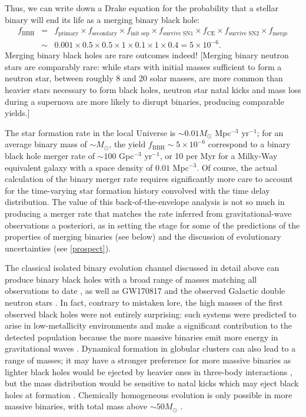 \documentclass[iop,onecolumn]{revtex4}
\begin{document}
Thus, we can write down a Drake equation for the probability that a stellar binary will end its life as a merging binary black hole:
\begin{eqnarray}
f_\textrm{BBH} &=& f_\textrm{primary} \times f_\textrm{secondary} \times f_\textrm{init sep} \times f_\textrm{survive SN1} \times f_\textrm{CE} \times f_\textrm{survive SN2} \times f_\textrm{merge} \nonumber \\
 & \sim & 0.001 \times 0.5 \times 0.5 \times 1 \times 0.1 \times 1 \times 0.4 = 5 \times 10^{-6}.
\end{eqnarray}
Merging binary black holes are rare outcomes indeed!  [Merging binary neutron stars are comparably rare: while stars with initial masses sufficient to form a neutron star, between roughly 8 and 20 solar masses, are more common than heavier stars necessary to form black holes, neutron star natal kicks and mass loss during a supernova are more likely to disrupt binaries, producing comparable yields.]

The star formation rate in the local Universe is $\sim 0.01 M_\odot$ Mpc$^{-3}$ yr$^{-1}$; for an average binary mass of $\sim M_\odot$, the yield $f_\textrm{BBH} \sim 5 \times 10^{-6}$ correspond to a binary black hole merger rate of $\sim 100$ Gpc$^{-3}$ yr$^{-1}$, or 10 per Myr for a Milky-Way equivalent galaxy with a space density of $0.01$ Mpc$^{-3}$.  Of course, the actual calculation of the binary merger rate requires significantly more care to account for the time-varying star formation history convolved with the time delay distribution.  The value of this back-of-the-envelope analysis is not so much in producing a merger rate that matches the rate inferred from gravitational-wave observations a posteriori, as in setting the stage for some of the predictions of the properties of merging binaries (see below) and the discussion of evolutionary uncertainties (see \autoref{prospect}).

The classical isolated binary evolution channel discussed in detail above can produce binary black holes with a broad range of masses matching all observations to date \citep[e.g.,][]{Stevenson:2017}, as well as GW170817 and the observed Galactic double neutron stars \citep[e.g.,][]{Kruckow:2018,VignaGomez:2018}.  In fact, contrary to mistaken lore, the high masses of the first observed black holes were not entirely surprising: such systems were predicted to arise in low-metallicity environments and make a significant contribution to the detected population because the more massive binaries emit more energy in gravitational waves \citep{Dominik:2015}.  Dynamical formation in globular clusters can also lead to a range of masses; it may have a stronger preference for more massive binaries as lighter black holes would be ejected by heavier ones in three-body interactions \citep{Rodriguez:2015}, but the mass distribution would be sensitive to natal kicks which may eject black holes at formation \citep{Zevin:2017}.  Chemically homogeneous evolution is only possible in more massive binaries, with total mass above $\sim 50 M_\odot$ \citep{MandeldeMink:2016,Marchant:2016}.
\end{document}
